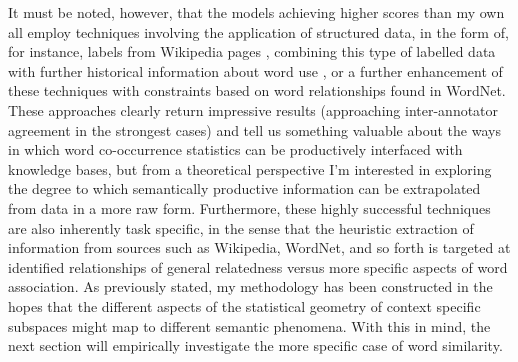 It must be noted, however, that the models achieving higher scores than my own all employ techniques involving the application of structured data, in the form of, for instance, labels from Wikipedia pages \citep{GabrilovichEA2007}, combining this type of labelled data with further historical information about word use \citep{RadinskyEA2011}, or a further enhancement of these techniques with constraints based on word relationships found in WordNet.  These approaches clearly return impressive results (approaching inter-annotator agreement in the strongest cases) and tell us something valuable about the ways in which word co-occurrence statistics can be productively interfaced with knowledge bases, but from a theoretical perspective I'm interested in exploring the degree to which semantically productive information can be extrapolated from data in a more raw form.  Furthermore, these highly successful techniques are also inherently task specific, in the sense that the heuristic extraction of information from sources such as Wikipedia, WordNet, and so forth is targeted at identified relationships of general relatedness versus more specific aspects of word association.  As previously stated, my methodology has been constructed in the hopes that the different aspects of the statistical geometry of context specific subspaces might map to different semantic phenomena.  With this in mind, the next section will empirically investigate the more specific case of word similarity.


